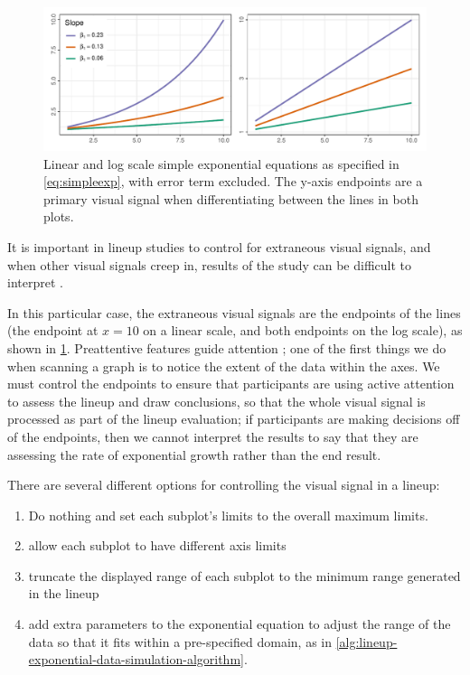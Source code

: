 \documentclass[12pt]{article}
\providecommand{\tightlist}{%
  \setlength{\itemsep}{0pt}\setlength{\parskip}{0pt}}
\begin{document}
\begin{figure}[hb]

{\centering \includegraphics[width=\linewidth,]{appendix_files/figure-latex/simple-exponential-1} 

}

\caption{Linear and log scale simple exponential equations as specified in \cref{eq:simpleexp}, with error term excluded. The y-axis endpoints are a primary visual signal when differentiating between the lines in both plots.}\label{fig:simple-exponential}
\end{figure}

It is important in lineup studies to control for extraneous visual
signals, and when other visual signals creep in, results of the study
can be difficult to interpret \citep{vanderplas_clusters_2017}.

In this particular case, the extraneous visual signals are the endpoints
of the lines (the endpoint at \(x=10\) on a linear scale, and both
endpoints on the log scale), as shown in \cref{fig:simple-exponential}.
Preattentive features guide attention
\citep{wolfeWhatPreattentiveFeature2019}; one of the first things we do
when scanning a graph is to notice the extent of the data within the
axes. We must control the endpoints to ensure that participants are
using active attention to assess the lineup and draw conclusions, so
that the whole visual signal is processed as part of the lineup
evaluation; if participants are making decisions off of the endpoints,
then we cannot interpret the results to say that they are assessing the
rate of exponential growth rather than the end result.

There are several different options for controlling the visual signal in
a lineup:

\begin{enumerate}
\def\labelenumi{\arabic{enumi}.}
\setcounter{enumi}{-1}
\tightlist
\item
  Do nothing and set each subplot's limits to the overall maximum
  limits.
\item
  allow each subplot to have different axis limits
\item
  truncate the displayed range of each subplot to the minimum range
  generated in the lineup
\item
  add extra parameters to the exponential equation to adjust the range
  of the data so that it fits within a pre-specified domain, as in
  \cref{alg:lineup-exponential-data-simulation-algorithm}.
\end{enumerate}
\end{document}
